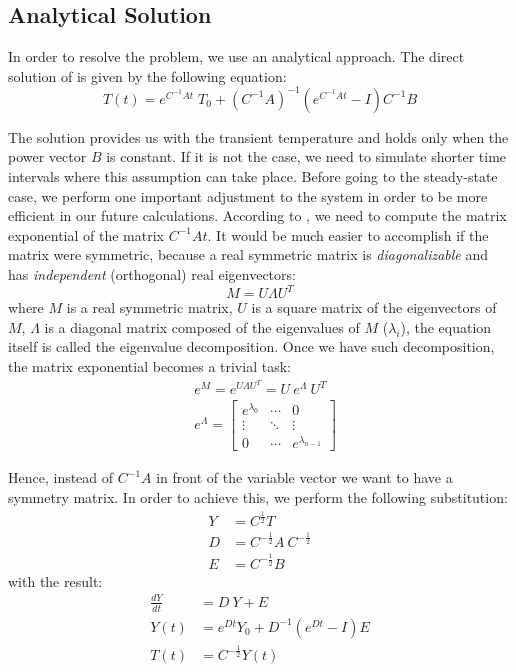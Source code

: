 \subsection{Analytical Solution}
In order to resolve the problem, we use an analytical approach. The direct solution of  is given by the following equation:
\begin{equation} \label{eq:solution}
  T(t) = e^{C^{-1}A t} \; T_0 + (C^{-1} A)^{-1}(e^{C^{-1}A t} - I)C^{-1} B
\end{equation}

The solution provides us with the transient temperature and holds only when the power vector $B$ is constant. If it is not the case, we need to simulate shorter time intervals where this assumption can take place. Before going to the steady-state case, we perform one important adjustment to the system in order to be more efficient in our future calculations. According to , we need to compute the matrix exponential of the matrix $C^{-1} A t$. It would be much easier to accomplish if the matrix were symmetric, because a real symmetric matrix is \emph{diagonalizable} and has \emph{independent} (orthogonal) real eigenvectors:
\begin{equation} \label{eq:eigenvalue-decomposition}
  M = U \Lambda U^T
\end{equation}
where $M$ is a real symmetric matrix, $U$ is a square matrix of the eigenvectors of $M$, $\Lambda$ is a diagonal matrix composed of the eigenvalues of $M$ ($\lambda_i$), the equation itself is called the eigenvalue decomposition. Once we have such decomposition, the matrix exponential becomes a trivial task:
\begin{align}
  & e^M = e^{U \Lambda U^T} = U \: e^{\Lambda} \: U^T \nonumber \\
  & e^{\Lambda} = \left[
      \begin{array}{ccc}
        e^{\lambda_0} & \cdots & 0 \\
        \vdots & \ddots & \vdots \\
        0 & \cdots & e^{\lambda_{n - 1}}
      \end{array}
    \right] \nonumber
\end{align}

Hence, instead of $C^{-1} A$ in front of the variable vector we want to have a symmetry matrix. In order to achieve this, we perform the following substitution:
\begin{align*}
  Y & = C^{\frac{1}{2}} T \\
  D & = C^{-\frac{1}{2}} A \: C^{-\frac{1}{2}} \\
  E & = C^{-\frac{1}{2}} B
\end{align*}
with the result:
\begin{align}
  \frac{dY}{dt} & = D \: Y + E \nonumber \\
  Y(t) & = e^{D t} Y_0 + D^{-1} (e^{D t} - I) E \label{eq:modified-solution} \\
  T(t) & = C^{-\frac{1}{2}} Y(t) \label{eq:finalization}
\end{align}

